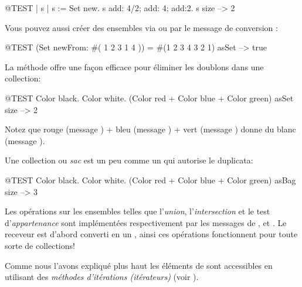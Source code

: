 \documentclass[a4paper,10pt,twoside]{book}
\begin{document}
\begin{code}{@TEST | s | }
s := Set new.
s add: 4/2; add: 4; add:2.
s size --> 2
\end{code}

Vous pouvez aussi créer des ensembles via  ou
par le message de conversion :

\begin{code}{@TEST}
(Set newFrom: #( 1 2 3 1 4 )) = #(1 2 3 4 3 2 1) asSet --> true
\end{code}

La méthode  offre une façon efficace pour éliminer les doublons dans une collection:
\begin{code}{@TEST}
{ Color black. Color white. (Color red + Color blue + Color green) } asSet size --> 2
\end{code}
\noindent
Notez que rouge (message ) + bleu (message ) + vert (message ) donne du blanc (message ).

Une collection  ou \emph{sac} est un peu comme un  
qui autorise le duplicata:
\begin{code}{@TEST}
{ Color black. Color white. (Color red + Color blue + Color green) } asBag size --> 3
\end{code}

Les opérations sur les ensembles telles que
l'\emph{union}, l'\emph{intersection} et le test d'\emph{appartenance} 
sont implémentées respectivement par les messages de  ,  et .
Le receveur est d'abord converti en un , ainsi ces opérations fonctionnent pour toute sorte de collections!



Comme nous l'avons expliqué plus haut les éléments de  sont
accessibles en utilisant des \emph{méthodes d'itérations (itérateurs)} (voir ).

\end{document}
